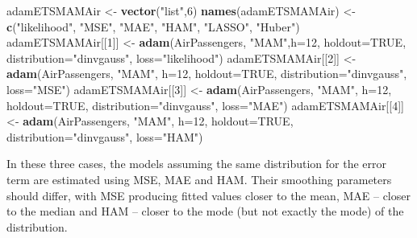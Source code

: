 \documentclass[]{book}
\newenvironment{Shaded}{\begin{snugshade}}{\end{snugshade}}
\newcommand{\DataTypeTok}[1]{\textcolor[rgb]{0.13,0.29,0.53}{#1}}
\newcommand{\DecValTok}[1]{\textcolor[rgb]{0.00,0.00,0.81}{#1}}
\newcommand{\KeywordTok}[1]{\textcolor[rgb]{0.13,0.29,0.53}{\textbf{#1}}}
\newcommand{\NormalTok}[1]{#1}
\newcommand{\OtherTok}[1]{\textcolor[rgb]{0.56,0.35,0.01}{#1}}
\newcommand{\StringTok}[1]{\textcolor[rgb]{0.31,0.60,0.02}{#1}}
\theoremstyle{definition}
\theoremstyle{definition}
\theoremstyle{definition}
\theoremstyle{definition}
\theoremstyle{remark}
\begin{document}
\begin{Shaded}
\begin{Highlighting}[]
\NormalTok{adamETSMAMAir <-}\StringTok{ }\KeywordTok{vector}\NormalTok{(}\StringTok{"list"}\NormalTok{,}\DecValTok{6}\NormalTok{)}
\KeywordTok{names}\NormalTok{(adamETSMAMAir) <-}
\StringTok{    }\KeywordTok{c}\NormalTok{(}\StringTok{"likelihood"}\NormalTok{, }\StringTok{"MSE"}\NormalTok{, }\StringTok{"MAE"}\NormalTok{, }\StringTok{"HAM"}\NormalTok{, }\StringTok{"LASSO"}\NormalTok{, }\StringTok{"Huber"}\NormalTok{)}
\NormalTok{adamETSMAMAir[[}\DecValTok{1}\NormalTok{]] <-}\StringTok{ }\KeywordTok{adam}\NormalTok{(AirPassengers, }\StringTok{"MAM"}\NormalTok{,}\DataTypeTok{h=}\DecValTok{12}\NormalTok{, }\DataTypeTok{holdout=}\OtherTok{TRUE}\NormalTok{,}
                           \DataTypeTok{distribution=}\StringTok{"dinvgauss"}\NormalTok{,}
                           \DataTypeTok{loss=}\StringTok{"likelihood"}\NormalTok{)}
\NormalTok{adamETSMAMAir[[}\DecValTok{2}\NormalTok{]] <-}\StringTok{ }\KeywordTok{adam}\NormalTok{(AirPassengers, }\StringTok{"MAM"}\NormalTok{, }\DataTypeTok{h=}\DecValTok{12}\NormalTok{, }\DataTypeTok{holdout=}\OtherTok{TRUE}\NormalTok{,}
                           \DataTypeTok{distribution=}\StringTok{"dinvgauss"}\NormalTok{,}
                           \DataTypeTok{loss=}\StringTok{"MSE"}\NormalTok{)}
\NormalTok{adamETSMAMAir[[}\DecValTok{3}\NormalTok{]] <-}\StringTok{ }\KeywordTok{adam}\NormalTok{(AirPassengers, }\StringTok{"MAM"}\NormalTok{, }\DataTypeTok{h=}\DecValTok{12}\NormalTok{, }\DataTypeTok{holdout=}\OtherTok{TRUE}\NormalTok{,}
                           \DataTypeTok{distribution=}\StringTok{"dinvgauss"}\NormalTok{,}
                           \DataTypeTok{loss=}\StringTok{"MAE"}\NormalTok{)}
\NormalTok{adamETSMAMAir[[}\DecValTok{4}\NormalTok{]] <-}\StringTok{ }\KeywordTok{adam}\NormalTok{(AirPassengers, }\StringTok{"MAM"}\NormalTok{, }\DataTypeTok{h=}\DecValTok{12}\NormalTok{, }\DataTypeTok{holdout=}\OtherTok{TRUE}\NormalTok{,}
                           \DataTypeTok{distribution=}\StringTok{"dinvgauss"}\NormalTok{,}
                           \DataTypeTok{loss=}\StringTok{"HAM"}\NormalTok{)}
\end{Highlighting}
\end{Shaded}

In these three cases, the models assuming the same distribution for the error term are estimated using MSE, MAE and HAM. Their smoothing parameters should differ, with MSE producing fitted values closer to the mean, MAE -- closer to the median and HAM -- closer to the mode (but not exactly the mode) of the distribution.
\end{document}
